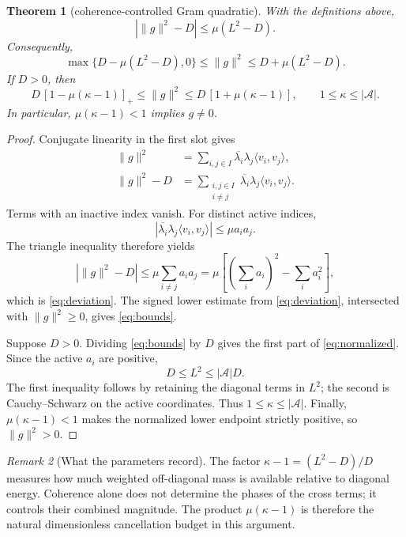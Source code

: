 \documentclass[11pt]{article}
\newtheorem{theorem}{Theorem}[section]
\theoremstyle{remark}
\newtheorem{remark}[theorem]{Remark}
\newcommand{\A}{\mathcal A}
\begin{document}
\begin{theorem}[coherence-controlled Gram quadratic]\label{thm:main}
With the definitions above,
\begin{equation}\label{eq:deviation}
 \left|\|g\|^2-D\right|\leq\mu(L^2-D).
\end{equation}
Consequently,
\begin{equation}\label{eq:bounds}
 \max\{D-\mu(L^2-D),0\}
 \leq\|g\|^2
 \leq D+\mu(L^2-D).
\end{equation}
If $D>0$, then
\begin{equation}\label{eq:normalized}
 D\,[1-\mu(\kappa-1)]_+
 \leq\|g\|^2
 \leq D\,[1+\mu(\kappa-1)],
 \qquad 1\leq\kappa\leq|\A|.
\end{equation}
In particular, $\mu(\kappa-1)<1$ implies $g\neq0$.
\end{theorem}

\begin{proof}
Conjugate linearity in the first slot gives
\begin{align}
 \|g\|^2
 &=\sum_{i,j\in I}\overline{\lambda_i}\lambda_j
   \langle v_i,v_j\rangle,\label{eq:expand}\\
 \|g\|^2-D
 &=\sum_{\substack{i,j\in I\\i\neq j}}
   \overline{\lambda_i}\lambda_j\langle v_i,v_j\rangle.
 \label{eq:offdiag}
\end{align}
Terms with an inactive index vanish.  For distinct active indices,
\[
 \left|\overline{\lambda_i}\lambda_j
 \langle v_i,v_j\rangle\right|
 \leq\mu a_i a_j.
\]
The triangle inequality therefore yields
\[
 \left|\|g\|^2-D\right|
 \leq\mu\sum_{i\neq j}a_i a_j
 =\mu\left[\left(\sum_i a_i\right)^2-\sum_i a_i^2\right],
\]
which is \eqref{eq:deviation}.  The signed lower estimate from
\eqref{eq:deviation}, intersected with $\|g\|^2\geq0$, gives
\eqref{eq:bounds}.

Suppose $D>0$.  Dividing \eqref{eq:bounds} by $D$ gives the first part of
\eqref{eq:normalized}.  Since the active $a_i$ are positive,
\[
 D\leq L^2\leq|\A|D.
\]
The first inequality follows by retaining the diagonal terms in $L^2$; the
second is Cauchy--Schwarz on the active coordinates.  Thus
$1\leq\kappa\leq|\A|$.  Finally, $\mu(\kappa-1)<1$ makes the normalized lower
endpoint strictly positive, so $\|g\|^2>0$.
\end{proof}

\begin{remark}[What the parameters record]
The factor $\kappa-1=(L^2-D)/D$ measures how much weighted off-diagonal mass is
available relative to diagonal energy.  Coherence alone does not determine
the phases of the cross terms; it controls their combined magnitude.  The
product $\mu(\kappa-1)$ is therefore the natural dimensionless cancellation
budget in this argument.
\end{remark}
\end{document}
